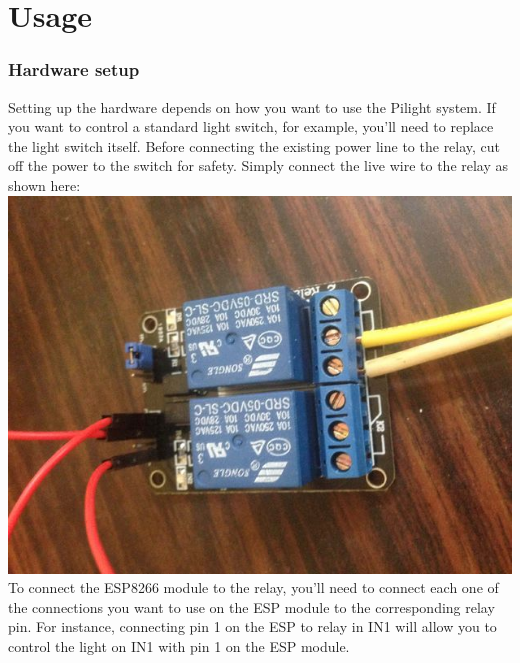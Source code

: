 \section{Usage}
\subsubsection{Hardware setup}
Setting up the hardware depends on how you want to use the Pilight system. If you want to control a standard light switch, for example, you'll need to replace the light switch itself. Before connecting the existing power line to the relay, cut off the power to the switch for safety. Simply connect the live wire to the relay as shown here:\\
\includegraphics[scale=0.5]{relay}\\
To connect the ESP8266 module to the relay, you'll need to connect each one of the connections you want to use on the ESP module to the corresponding relay pin. For instance, connecting pin 1 on the ESP to relay in IN1 will allow you to control the light on IN1 with pin 1 on the ESP module.\\
